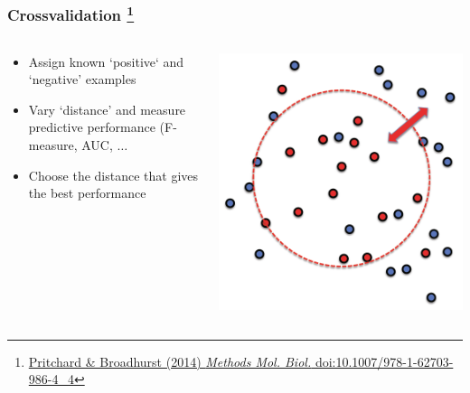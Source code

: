 \begin{frame}
  \frametitle{Crossvalidation
  \footnote{\tiny{\href{http://dx.doi.org/10.1007/978-1-62703-986-4_4}{Pritchard \& Broadhurst (2014) \textit{Methods Mol. Biol.} doi:10.1007/978-1-62703-986-4\_4}}}
}
  \begin{columns}[T]
    \begin{column}{5cm}  
      \begin{itemize}  
        \item \textcolor{hutton_green}{Assign known `positive` and `negative' examples}
        \item \textcolor{hutton_blue}{Vary `distance' and measure predictive performance (F-measure, AUC, $\ldots$}
        \item \textcolor{hutton_purple}{Choose the distance that gives the best performance}
        \end{itemize}  
      \end{column}
    \begin{column}{5cm}  
      \includegraphics[width=1\textwidth]{images/finding_effectors11}    
    \end{column}
  \end{columns} 
\end{frame}

